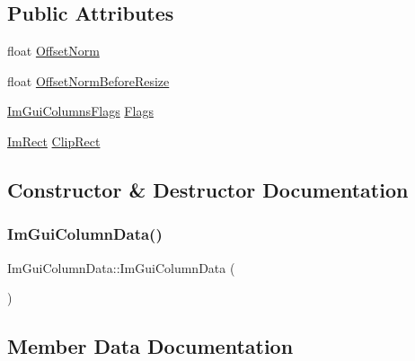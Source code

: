 \subsection*{Public Attributes}
\begin{DoxyCompactItemize}
\item 
float \mbox{\hyperlink{struct_im_gui_column_data_a9678a00f55c9fa44ed35ec14ea9b697b}{Offset\+Norm}}
\item 
float \mbox{\hyperlink{struct_im_gui_column_data_aa97d00380db4a4b11ebc1f1f8ef72fc8}{Offset\+Norm\+Before\+Resize}}
\item 
\mbox{\hyperlink{imgui_8h_a0edb3053546fcf6c5f7dcb7531c3a17a}{Im\+Gui\+Columns\+Flags}} \mbox{\hyperlink{struct_im_gui_column_data_ab683ea097b8c60f143dc3c31818fa8d8}{Flags}}
\item 
\mbox{\hyperlink{struct_im_rect}{Im\+Rect}} \mbox{\hyperlink{struct_im_gui_column_data_aeccf8bbbd380fdd9d3350b5aac95ad34}{Clip\+Rect}}
\end{DoxyCompactItemize}


\subsection{Constructor \& Destructor Documentation}
\mbox{\label{struct_im_gui_column_data_a296c9275c6e711dfd63ac0a3c1bb8c99}} 
\subsubsection{\texorpdfstring{Im\+Gui\+Column\+Data()}{ImGuiColumnData()}}
{\footnotesize\ttfamily Im\+Gui\+Column\+Data\+::\+Im\+Gui\+Column\+Data (\begin{DoxyParamCaption}{ }\end{DoxyParamCaption})\hspace{0.3cm}{\ttfamily [inline]}}



\subsection{Member Data Documentation}
\mbox{\label{struct_im_gui_column_data_aeccf8bbbd380fdd9d3350b5aac95ad34}} 
